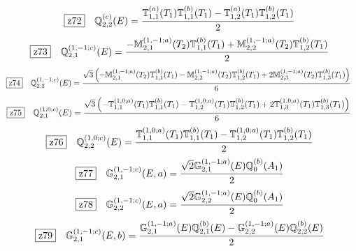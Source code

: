 \documentclass[fleqn,10pt,landscape]{jsarticle}
\begin{document}
\begin{dmath*}
\hspace*{3mm}\fbox{z72}\quad \mathbb{Q}_{2,2}^{(c)}(E)=\frac{\mathbb{T}_{1,1}^{(a)}(T_{1}) \mathbb{T}_{1,1}^{(b)}(T_{1}) - \mathbb{T}_{1,2}^{(a)}(T_{1}) \mathbb{T}_{1,2}^{(b)}(T_{1})}{2}
\end{dmath*}
\begin{dmath*}
\hspace*{3mm}\fbox{z73}\quad \mathbb{Q}_{2,1}^{(1,-1;c)}(E)=\frac{- \mathbb{M}_{2,1}^{(1,-1;a)}(T_{2}) \mathbb{T}_{1,1}^{(b)}(T_{1}) + \mathbb{M}_{2,2}^{(1,-1;a)}(T_{2}) \mathbb{T}_{1,2}^{(b)}(T_{1})}{2}
\end{dmath*}
\begin{dmath*}
\hspace*{3mm}\fbox{z74}\quad \mathbb{Q}_{2,2}^{(1,-1;c)}(E)=\frac{\sqrt{3} \left(- \mathbb{M}_{2,1}^{(1,-1;a)}(T_{2}) \mathbb{T}_{1,1}^{(b)}(T_{1}) - \mathbb{M}_{2,2}^{(1,-1;a)}(T_{2}) \mathbb{T}_{1,2}^{(b)}(T_{1}) + 2 \mathbb{M}_{2,3}^{(1,-1;a)}(T_{2}) \mathbb{T}_{1,3}^{(b)}(T_{1})\right)}{6}
\end{dmath*}
\begin{dmath*}
\hspace*{3mm}\fbox{z75}\quad \mathbb{Q}_{2,1}^{(1,0;c)}(E)=\frac{\sqrt{3} \left(- \mathbb{T}_{1,1}^{(1,0;a)}(T_{1}) \mathbb{T}_{1,1}^{(b)}(T_{1}) - \mathbb{T}_{1,2}^{(1,0;a)}(T_{1}) \mathbb{T}_{1,2}^{(b)}(T_{1}) + 2 \mathbb{T}_{1,3}^{(1,0;a)}(T_{1}) \mathbb{T}_{1,3}^{(b)}(T_{1})\right)}{6}
\end{dmath*}
\begin{dmath*}
\hspace*{3mm}\fbox{z76}\quad \mathbb{Q}_{2,2}^{(1,0;c)}(E)=\frac{\mathbb{T}_{1,1}^{(1,0;a)}(T_{1}) \mathbb{T}_{1,1}^{(b)}(T_{1}) - \mathbb{T}_{1,2}^{(1,0;a)}(T_{1}) \mathbb{T}_{1,2}^{(b)}(T_{1})}{2}
\end{dmath*}
\begin{dmath*}
\hspace*{3mm}\fbox{z77}\quad \mathbb{G}_{2,1}^{(1,-1;c)}(E,a)=\frac{\sqrt{2} \mathbb{G}_{2,1}^{(1,-1;a)}(E) \mathbb{Q}_{0}^{(b)}(A_{1})}{2}
\end{dmath*}
\begin{dmath*}
\hspace*{3mm}\fbox{z78}\quad \mathbb{G}_{2,2}^{(1,-1;c)}(E,a)=\frac{\sqrt{2} \mathbb{G}_{2,2}^{(1,-1;a)}(E) \mathbb{Q}_{0}^{(b)}(A_{1})}{2}
\end{dmath*}
\begin{dmath*}
\hspace*{3mm}\fbox{z79}\quad \mathbb{G}_{2,1}^{(1,-1;c)}(E,b)=\frac{\mathbb{G}_{2,1}^{(1,-1;a)}(E) \mathbb{Q}_{2,1}^{(b)}(E) - \mathbb{G}_{2,2}^{(1,-1;a)}(E) \mathbb{Q}_{2,2}^{(b)}(E)}{2}
\end{dmath*}
\end{document}
